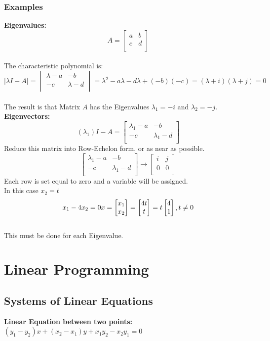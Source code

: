 \documentclass[]{article}
\begin{document}
\subsubsection{Examples}
\textbf{Eigenvalues:}\\
$$ A =
	\begin{bmatrix}
		a & b \\ c & d \\
	\end{bmatrix} $$ \\
The characteristic polynomial is: \\
$$ \left| \lambda I - A \right| = 
	\begin{vmatrix}
		\lambda -a & -b \\ -c & \lambda -d \\
	\end{vmatrix} =
	\lambda^2 -a\lambda -d\lambda + (-b)(-c) =
	(\lambda + i)(\lambda + j) = 0 $$ \\
The result is that Matrix $A$ has the Eigenvalues $\lambda_1 = -i$ 
and $\lambda_2 = -j$. \\
\textbf{Eigenvectors:}\\
$$ (\lambda_1)I-A = 
	\begin{bmatrix}
		\lambda_1 -a & -b \\ -c & \lambda_1 -d \\
	\end{bmatrix} $$
Reduce this matrix into Row-Echelon form, or as near as possible.
$$ 	\begin{bmatrix}
		\lambda_1 -a & -b \\ -c & \lambda_1 -d \\
	\end{bmatrix}
		\rightarrow
	\begin{bmatrix}
		i & j \\ 0 & 0 \\
	\end{bmatrix} $$
Each row is set equal to zero and a variable will be assigned. \\
In this case $x_2 = t $ \\
$$ x_1 - 4x_2 = 0 \\
	x = 
	\begin{bmatrix} x_1 \\ x_2 \end{bmatrix} =
	\begin{bmatrix} 4t \\ t \end{bmatrix} =
	t\begin{bmatrix} 4 \\ 1 \end{bmatrix}, 
	t \neq 0 $$ \\
This must be done for each Eigenvalue.

\section{Linear Programming}

\subsection{Systems of Linear Equations}
\textbf{Linear Equation between two points:} \\
$ (y_1-y_2)x + (x_2-x_1)y + x_1y_2-x_2y_1 = 0 $
\end{document}
